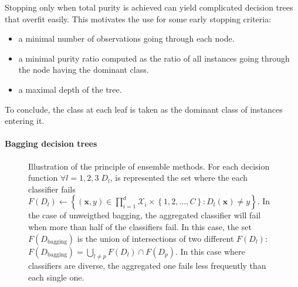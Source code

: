                 Stopping only when total purity is achieved can yield complicated decision trees that overfit easily.
                This motivates the use for some early stopping criteria:
                \begin{itemize}
                    \item a minimal number of observations going through each node.
                    \item a minimal purity ratio computed as the ratio of all instances going through the node having the dominant class.
                    \item a maximal depth of the tree.
                \end{itemize}
                To conclude, the class at each leaf is taken as the dominant class of instances entering it.

            \paragraph{Bagging decision trees}
                \begin{figure}
                    \centering
                    
                    \caption[
                        Illustration of the principle of ensemble methods.
                    ]{
                        \label{fig::ensemble} Illustration of the principle of ensemble methods.
                        For each decision function $\forall l=1,2,3\;D_l$, is represented the set where the each classifier fails $F(D_l) \leftarrow \left\{(\bm{x}, y) \in \prod_{i=1}^{d}\mathscr{X}_i \times \left\{1,2,\dots,C\right\} : D_l(\bm{x}) \neq y\right\}$.
                        In the case of unweigthed bagging, the aggregated classifier will fail when more than half of the classifiers fail.
                        In this case, the set $F(D_{\text{bagging}})$ is the union of intersections of two different $F(D_l)$: $F(D_{\text{bagging}}) = \bigcup_{l\neq p} F(D_l) \cap F(D_p)$.
                        In this case where classifiers are diverse, the aggregated one fails less frequently than each single one.
                    }
                \end{figure}

